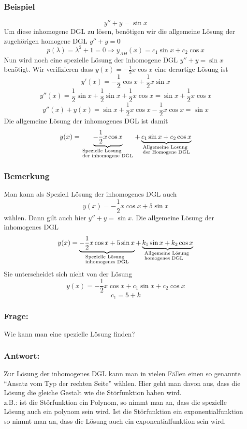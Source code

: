\subsubsection*{Beispiel}
\[y''+y=\sin x\]
Um diese inhomogene DGL zu lösen, benötigen wir die allgemeine Lösung der zugehörigen homogene DGL $y''+y=0$\[p(\lambda)=\lambda^2+1=0\Rightarrow y_{AH}(x)=c_1\sin x+c_2\cos x\] Nun wird noch eine spezielle Lösung der inhomogene DGL $y''+y=\sin x$ benötigt. Wir verifizieren dass $y(x)=-\frac{1}{2}x\cos x$ eine derartige Lösung ist
\[y'(x)=-\frac{1}{2}\cos x+\frac{1}{2}x\sin x\]
\[y''(x)=\frac{1}{2}\sin x+\frac{1}{2}\sin x+\frac{1}{2}x\cos x=\sin x+\frac{1}{2}x\cos x\]
\[y''(x)+y(x)=\sin x+\frac{1}{2}x\cos x-\frac{1}{2}x\cos x=\sin x\] Die allgemeine Lösung der inhomogenes DGL ist damit $$y(x) = \underbrace { - \frac{1}{2}x\cos x}_{\scriptstyle{\text{Spezielle Losung }}\hfill\atop
\scriptstyle{\text{der inhomogene DGL}}\hfill} + \underbrace {{c_1}\sin x + {c_2}\cos x}_{\scriptstyle{\text{Allgemeine Losung }}\hfill\atop
\scriptstyle{\text{der Homogene DGL}}\hfill}$$
\subsubsection*{Bemerkung}
Man kann als Speziell Lösung der inhomogenes DGL auch \[y(x)=-\frac{1}{2}x\cos x+5\sin x\] wählen. Dann gilt auch hier $y''+y=\sin x$. Die allgemeine Lösung der inhomogenes DGL 
\[y(x) = \underbrace { - \frac{1}{2}x\cos x + 5\sin x}_{\scriptstyle{\text{Spezielle Lösung }}\hfill\atop
\scriptstyle{\text{inhomogenes DGL}}\hfill} + \underbrace {{k_1}\sin x + {k_2}\cos x}_{\scriptstyle{\text{Allgemeine Lösung }}\hfill\atop
\scriptstyle{\text{homogenes DGL}}\hfill}\] Sie unterscheidet sich nicht von der Lösung \[y(x)=-\frac{1}{2}x\cos x+c_1\sin x+c_2\cos x\]
\[c_1=5+k\]
\subsubsection*{Frage:}
Wie kann man eine spezielle Lösung finden?
\subsubsection*{Antwort:}
Zur Lösung der inhomogenes DGL kann man in vielen Fällen einen so genannte ``Ansatz vom Typ der rechten Seite'' wählen. Hier geht man davon aus, dass die Lösung die gleiche Gestalt wie die Störfunktion haben wird.\\

\noindent z.B.: ist die Störfunktion ein Polynom, so nimmt man an, dass die spezielle Lösung auch ein polynom sein wird. Ist die Störfunktion ein exponentialfunktion so nimmt man an, dass die Lösung auch ein exponentialfunktion sein wird.


